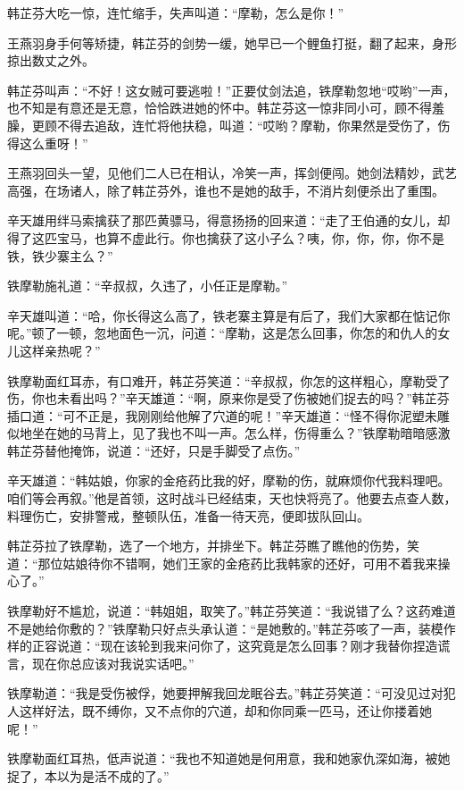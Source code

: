 \documentclass[12pt,oneside]{book}
\begin{document}
韩芷芬大吃一惊，连忙缩手，失声叫道：``摩勒，怎么是你！''

王燕羽身手何等矫捷，韩芷芬的剑势一缓，她早已一个鲤鱼打挺，翻了起来，身形掠出数丈之外。

韩芷芬叫声：``不好！这女贼可要逃啦！''正要仗剑法追，铁摩勒忽地``哎哟''一声，也不知是有意还是无意，恰恰跌进她的怀中。韩芷芬这一惊非同小可，顾不得羞臊，更顾不得去追敌，连忙将他扶稳，叫道：``哎哟？摩勒，你果然是受伤了，伤得这么重呀！''

王燕羽回头一望，见他们二人已在相认，冷笑一声，挥剑便闯。她剑法精妙，武艺高强，在场诸人，除了韩芷芬外，谁也不是她的敌手，不消片刻便杀出了重围。

辛天雄用绊马索擒获了那匹黄骠马，得意扬扬的回来道：``走了王伯通的女儿，却得了这匹宝马，也算不虚此行。你也擒获了这小子么？咦，你，你，你，你不是铁，铁少寨主么？''

铁摩勒施礼道：``辛叔叔，久违了，小任正是摩勒。''

辛天雄叫道：``哈，你长得这么高了，铁老寨主算是有后了，我们大家都在惦记你呢。''顿了一顿，忽地面色一沉，问道：``摩勒，这是怎么回事，你怎的和仇人的女儿这样亲热呢？''

铁摩勒面红耳赤，有口难开，韩芷芬笑道：``辛叔叔，你怎的这样粗心，摩勒受了伤，你也未看出吗？''辛天雄道：``啊，原来你是受了伤被她们捉去的吗？''韩芷芬插口道：``可不正是，我刚刚给他解了穴道的呢！''辛天雄道：``怪不得你泥塑未雕似地坐在她的马背上，见了我也不叫一声。怎么样，伤得重么？''铁摩勒暗暗感激韩芷芬替他掩饰，说道：``还好，只是手脚受了点伤。''

辛天雄道：``韩姑娘，你家的金疮药比我的好，摩勒的伤，就麻烦你代我料理吧。咱们等会再叙。''他是首领，这时战斗已经结束，天也快将亮了。他要去点查人数，料理伤亡，安排警戒，整顿队伍，准备一待天亮，便即拔队回山。

韩芷芬拉了铁摩勒，选了一个地方，并排坐下。韩芷芬瞧了瞧他的伤势，笑道：``那位姑娘待你不错啊，她们王家的金疮药比我韩家的还好，可用不着我来操心了。''

铁摩勒好不尴尬，说道：``韩姐姐，取笑了。''韩芷芬笑道：``我说错了么？这药难道不是她给你敷的？''铁摩勒只好点头承认道：``是她敷的。''韩芷芬咳了一声，装模作样的正容说道：``现在该轮到我来问你了，这究竟是怎么回事？刚才我替你捏造谎言，现在你总应该对我说实话吧。''

铁摩勒道：``我是受伤被俘，她要押解我回龙眠谷去。''韩芷芬笑道：``可没见过对犯人这样好法，既不缚你，又不点你的穴道，却和你同乘一匹马，还让你搂着她呢！''

铁摩勒面红耳热，低声说道：``我也不知道她是何用意，我和她家仇深如海，被她捉了，本以为是活不成的了。''
\end{document}
